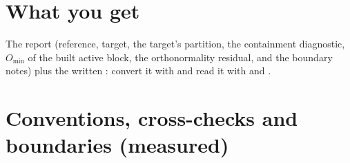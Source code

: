 \section{What you get}

The report  (reference, target, the target's
partition, the containment diagnostic, $O_{\min}$ of the built active
block, the orthonormality residual, and the boundary notes) plus the
written : convert it with
 and read it with  and
.

\section{Conventions, cross-checks and boundaries (measured)}

